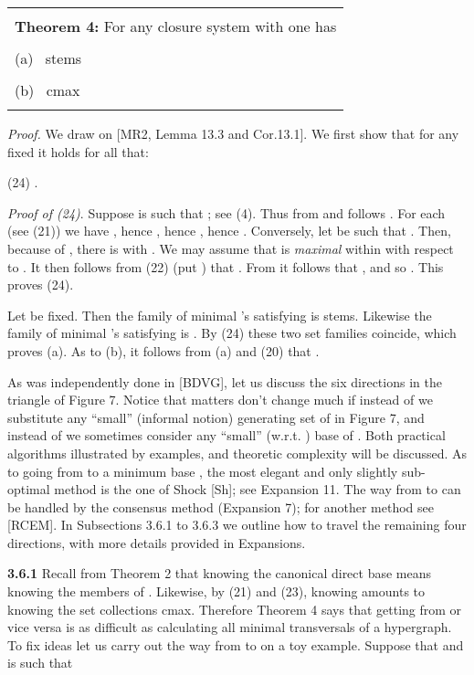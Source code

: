 \documentclass[11pt]{article}
\begin{document}
\begin{tabular}{|l|} \hline \\
{\bf Theorem 4:} For any closure system  with   one has\\
\\
(a) \ stems\\
\\
(b) \ cmax\\
\\
\hline \end{tabular}

{\it Proof.} We draw on [MR2, Lemma 13.3 and Cor.13.1]. We first show that for any fixed  it holds for all  that:

(24) \quad .

{\it Proof of (24)}. Suppose  is such  that ; see (4). Thus from  and  follows . For each  (see (21)) we have , hence , hence , hence . Conversely, let  be such that . Then, because of , there is  with . We may assume that  is {\it maximal} within  with respect to . It then follows from (22) (put ) that . From  it follows that , and so .  This proves (24). 

Let  be fixed. Then the family of minimal 's satisfying  is stems. Likewise the family of minimal 's satisfying  is . By (24) these two set families coincide, which proves (a).
As to (b), it follows from (a) and (20) that
. \hfill 


As was independently done in [BDVG], let us discuss the six directions in the triangle of Figure 7. Notice that matters don't change much if instead of  we substitute any ``small'' (informal notion) generating set  of  in Figure 7, and instead of  we sometimes consider any ``small'' (w.r.t. ) base  of .
Both practical algorithms illustrated by examples, and theoretic complexity will be discussed. As to going from  to a minimum base , the most elegant and only slightly sub-optimal method is the one of Shock [Sh]; see Expansion 11. The way from  to  can be handled by the consensus method (Expansion 7); for another method see [RCEM].  
In Subsections 3.6.1 to 3.6.3 we outline how to travel the remaining four directions, with more details provided in Expansions. 

{\bf 3.6.1} Recall from Theorem 2 that knowing the canonical direct base  means knowing the members of . Likewise, by (21) and (23), knowing  amounts to knowing the set collections cmax. Therefore Theorem 4 says that getting  from  or vice versa is as difficult as calculating all minimal transversals of a hypergraph. To fix ideas let us carry out the way from  to  on a toy example. Suppose that  and  is such that
\end{document}
